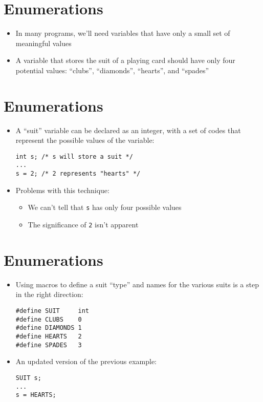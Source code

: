 \documentclass{article}
\begin{document}
\section{Enumerations}
\begin{itemize}
\item In many programs, we'll need variables that have only a small set of meaningful values

\item A variable that stores the suit of a playing card should have only four potential values: ``clubs'', ``diamonds'', ``hearts'', and ``spades''
\end{itemize}



\section{Enumerations}
\begin{itemize}
\item A ``suit'' variable can be declared as an integer, with a set of codes that represent the possible values of the variable:
\begin{verbatim}
int s; /* s will store a suit */
...
s = 2; /* 2 represents "hearts" */
\end{verbatim}

\item Problems with this technique:
\begin{itemize}
\item We can't tell that \verb!s! has only four possible values
\item The significance of \verb!2! isn't apparent
\end{itemize}
\end{itemize}



\section{Enumerations}
\begin{itemize}
\item Using macros to define a suit ``type'' and names for the various suits is a step in the right direction:
\begin{verbatim}
#define SUIT     int
#define CLUBS    0
#define DIAMONDS 1
#define HEARTS   2
#define SPADES   3
\end{verbatim}

\item An updated version of the previous example:
\begin{verbatim}
SUIT s;
...
s = HEARTS;
\end{verbatim}
\end{itemize}
\end{document}
